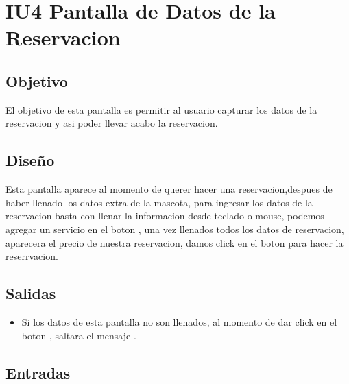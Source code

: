 \section{IU4 Pantalla de Datos de la Reservacion}

\subsection{Objetivo}
	\cdtInstrucciones El objetivo de esta pantalla es permitir al usuario capturar los datos de la reservacion y asi poder llevar acabo la reservacion.

\subsection{Diseño}
	\cdtInstrucciones Esta pantalla  aparece al momento de querer hacer una reservacion,despues de haber llenado los datos extra de la mascota, para ingresar los datos de la reservacion basta con llenar la informacion desde teclado o mouse, podemos agregar un servicio en el boton , una vez llenados todos los datos de reservacion, aparecera el precio de nuestra reservacion, damos click en el boton  para hacer la reserrvacion.



\subsection{Salidas}


	\begin{itemize}
		\item Si los datos de esta pantalla no son llenados, al momento de dar click en el boton , saltara el mensaje .
	\end{itemize}
	
\subsection{Entradas}

